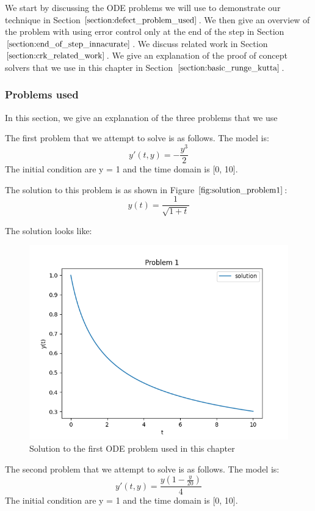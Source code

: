 \documentclass{article}
\begin{document}
We start by discussing the ODE problems we will use to demonstrate our technique in Section $\ref{section:defect_problem_used}$. We then give an overview of the problem with using error control only at the end of the step in Section $\ref{section:end_of_step_innacurate}$. We discuss related work in Section $\ref{section:crk_related_work}$. We give an explanation of the proof of concept solvers that we use in this chapter in Section $\ref{section:basic_runge_kutta}$. 

\subsubsection{Problems used}
\label{section:defect_problem_used}
In this section, we give an explanation of the three problems that we use 

The first problem that we attempt to solve is as follows.
The model is:
\begin{equation}
y'(t, y) = - \frac{y^{3}}{2} 
\end{equation}
The initial condition are y = 1 and the time domain is [0, 10].

The solution to this problem is as shown in Figure $\ref{fig:solution_problem1}$:
\begin{equation}
y(t) = \frac
{1}
{\sqrt{1 + t}}
\end{equation}

The solution looks like:
\begin{figure}[H]
\centering
\includegraphics[width=0.7\linewidth]{./figures/solution_problem1}
\caption{Solution to the first ODE problem used in this chapter}
\label{fig:solution_problem1}
\end{figure}

The second problem that we attempt to solve is as follows.
The model is:
\begin{equation}
y'(t, y) = \frac{y(1 - \frac{y}{20})}
{4} 
\end{equation}
The initial condition are y = 1 and the time domain is [0, 10].
\end{document}
